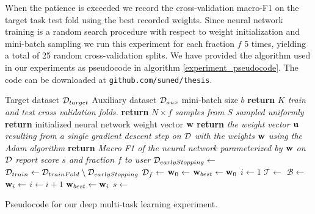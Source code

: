 When the patience is exceeded we record the cross-validation macro-F1 on the target task test fold using the best recorded weights. Since neural network training is a random search procedure with respect to weight initialization and mini-batch sampling we run this experiment for each fraction $f$ 5 times, yielding a total of 25 random cross-validation splits. We have provided the algorithm used in our experiments as pseudocode in algorithm \ref{experiment_pseudocode}. The code can be downloaded at \texttt{github.com/suned/thesis}.
\begin{algorithm}
\begin{algorithmic}
	\Require Target dataset $\mathcal{D}_{target}$
	\Require Auxiliary dataset $\mathcal{D}_{aux}$
	\Require mini-batch size $b$
		\State \textbf{return} \textit{$K$ train and test cross validation folds.}
	\EndFunction
		\State \textbf{return} \textit{$N \times f$ samples from $S$ sampled uniformly}
	\EndFunction
		\State \textbf{return} initialized neural network weight vector $\mathbf{w}$
	\EndFunction
		\State \textbf{return} \textit{the weight vector $\mathbf{u}$ resulting from a single gradient descent step on $\mathcal{D}$ with the weights $\mathbf{w}$ using the Adam algorithm}
	\EndFunction
		\State \textbf{return} \textit{Macro F1 of the neural network parameterized by $\mathbf{w}$ on $\mathcal{D}$}
	\EndFunction
		\State \textit{report score $s$ and fraction $f$ to user}
	\EndFunction
				\State $\mathcal{D}_{earlyStopping} \gets$ 
				\State $\mathcal{D}_{train} \gets \mathcal{D}_{trainFold} \setminus \mathcal{D}_{earlyStopping}$
				\State $\mathcal{D}_{f} \gets $ 
				\State $\mathbf{w}_0 \gets$ 
				\State $\mathbf{w}_{best} \gets \mathbf{w}_0$
				\State $i \gets 1$
					\State $\mathcal{T} \gets$ 
					\State $\mathcal{B} \gets$ 
					\State $\mathbf{w}_i \gets$ 
					\State $i \gets i + 1$
						\State $\mathbf{w}_{best} \gets \mathbf{w}_i$
					\EndIf
				\EndWhile
				\State $s \gets$ 
				\State {}
			\EndFor
		\EndFor
	\EndFor
\end{algorithmic}
\caption{Pseudocode for our deep multi-task learning experiment.}
\label{experiment_pseudocode}
\end{algorithm}
